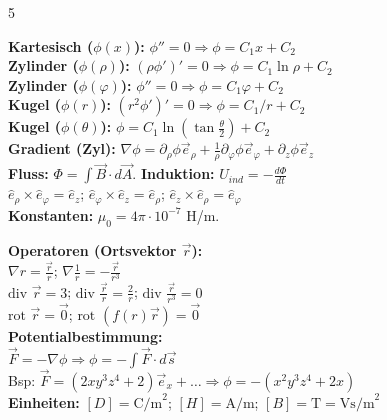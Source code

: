 \documentclass[a4paper, 2pt, landscape]{extarticle}
\begin{document}
\begin{multicols*}{5}
\begin{tcolorbox}[title={Nützliche Laplace-Lösungen}, colback=white, colframe=boxtitle]
\textbf{Kartesisch ($\phi(x)$):} $\phi''=0 \Rightarrow \phi = C_1 x + C_2$ \\
\textbf{Zylinder ($\phi(\rho)$):} $(\rho \phi')' = 0 \Rightarrow \phi = C_1 \ln \rho + C_2$ \\
\textbf{Zylinder ($\phi(\varphi)$):} $\phi''=0 \Rightarrow \phi = C_1 \varphi + C_2$ \\
\textbf{Kugel ($\phi(r)$):} $(r^2 \phi')' = 0 \Rightarrow \phi = C_1/r + C_2$ \\
\textbf{Kugel ($\phi(\theta)$):} $\phi = C_1 \ln(\tan \frac{\theta}{2}) + C_2$ \\
\textbf{Gradient (Zyl):} $\nabla \phi = \partial_\rho \phi \vec{e}_\rho + \frac{1}{\rho} \partial_\varphi \phi \vec{e}_\varphi + \partial_z \phi \vec{e}_z$ \\
\textbf{Fluss:} $\Phi = \int \vec{B} \cdot d\vec{A}$. \textbf{Induktion:} $U_{ind} = -\frac{d\Phi}{dt}$ \\
$\hat{e}_\rho \times \hat{e}_\varphi = \hat{e}_z$; $\hat{e}_\varphi \times \hat{e}_z = \hat{e}_\rho$; $\hat{e}_z \times \hat{e}_\rho = \hat{e}_\varphi$ \\
\textbf{Konstanten:} $\mu_0 = 4\pi \cdot 10^{-7}$ H/m.
\end{tcolorbox}

\begin{tcolorbox}[title={Vektoranalysis \& Grundlagen (B1 \& B10)}]
\textbf{Operatoren (Ortsvektor $\vec{r}$):} \\
$\nabla r = \frac{\vec{r}}{r}$; \quad $\nabla \frac{1}{r} = -\frac{\vec{r}}{r^3}$ \\
$\text{div } \vec{r} = 3$; \quad $\text{div } \frac{\vec{r}}{r} = \frac{2}{r}$; \quad $\text{div } \frac{\vec{r}}{r^3} = 0$ \\
$\text{rot } \vec{r} = \vec{0}$; \quad $\text{rot } (f(r)\vec{r}) = \vec{0}$ \\
\textbf{Potentialbestimmung:} \\
$\vec{F} = -\nabla \phi \Rightarrow \phi = -\int \vec{F} \cdot d\vec{s}$ \\
Bsp: $\vec{F}=(2xy^3z^4+2)\vec{e}_x + \dots \Rightarrow \phi = -(x^2y^3z^4+2x)$ \\
\textbf{Einheiten:} $[D] = \text{C/m}^2$; $[H] = \text{A/m}$; $[B] = \text{T} = \text{Vs/m}^2$
\end{tcolorbox}


\end{multicols*}
\end{document}
